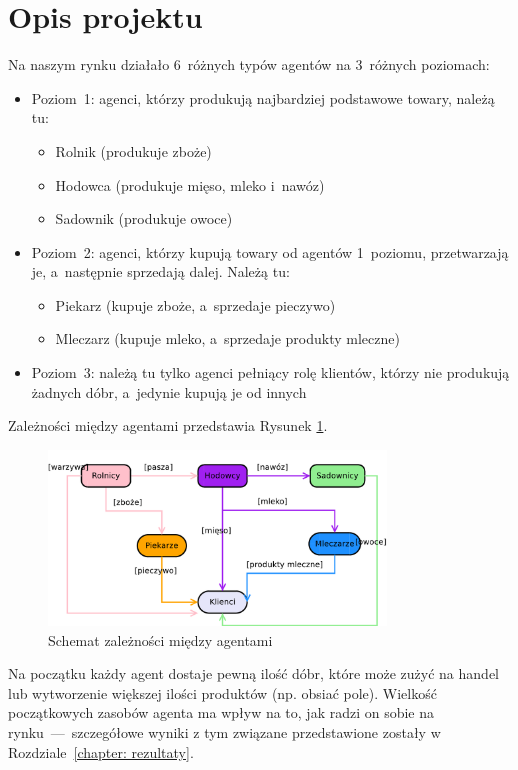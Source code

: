 \documentclass[12pt]{article}
\begin{document}
\section{Opis projektu}
Na naszym rynku działało 6~różnych typów agentów na 3~różnych poziomach:
\begin{itemize}
 \item Poziom~1: agenci, którzy produkują najbardziej podstawowe towary, należą tu:
  \begin{itemize}
  \item Rolnik (produkuje zboże)
  \item Hodowca (produkuje mięso, mleko i~nawóz)
  \item Sadownik (produkuje owoce)
  \end{itemize}
 \item Poziom~2: agenci, którzy kupują towary od agentów 1~poziomu, przetwarzają je, a~następnie sprzedają dalej. Należą tu:
  \begin{itemize}
   \item Piekarz (kupuje zboże, a~sprzedaje pieczywo)
   \item Mleczarz (kupuje mleko, a~sprzedaje produkty mleczne)
  \end{itemize}
 \item Poziom~3: należą tu tylko agenci pełniący rolę klientów, którzy nie produkują żadnych dóbr, a~jedynie kupują je od innych
\end{itemize}

Zależności między agentami przedstawia Rysunek \ref{fig:schemat zależności}.
\begin{figure} [H]
 \centering
 \includegraphics[width=0.8\textwidth]{obrazki/diagram_kolorowy}
 \caption{Schemat zależności między agentami}
 \label{fig:schemat zależności}
\end{figure}

Na początku każdy agent dostaje pewną ilość dóbr, które może zużyć na handel lub wytworzenie większej ilości produktów (np. obsiać pole). Wielkość początkowych zasobów agenta ma wpływ na to, jak radzi on sobie
na rynku~---~szczegółowe wyniki z tym związane przedstawione zostały w Rozdziale~\ref{chapter: rezultaty}.
\end{document}
